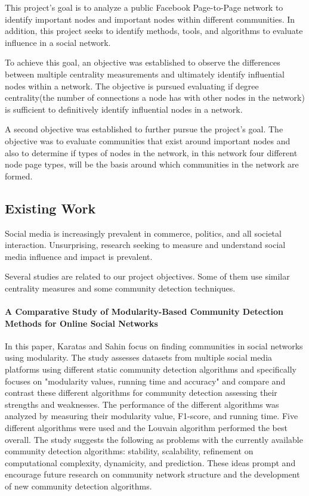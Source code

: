 \documentclass[11pt,twocolumn]{article}
\begin{document}
This project's goal is to analyze a public Facebook Page-to-Page network to identify important nodes and important nodes within different communities. In addition, this project seeks to identify methods, tools, and algorithms to evaluate influence in a social network. 

To achieve this goal, an objective was established to observe the differences between multiple centrality measurements and ultimately identify influential nodes within a network. The objective is pursued evaluating if degree centrality(the number of connections a node has with other nodes in the network) is sufficient to definitively identify influential nodes in a network.


A second objective was established to further pursue the project’s goal. The objective was to evaluate communities that exist around important nodes and also to determine if types of nodes in the network, in this network four different node page types, will be the basis around which communities in the network are formed.


\subsection{Existing Work}

Social media is increasingly prevalent in commerce, politics, and all societal interaction. Unsurprising, research seeking to measure and understand social media influence and impact is prevalent. 

Several studies are related to our project objectives. Some of them use similar centrality measures and some community detection techniques. 

\paragraph{A Comparative Study of Modularity-Based Community Detection Methods for Online Social Networks \cite{modularity-based-community}}   
 
In this paper, Karatas and Sahin focus on finding communities in social networks using modularity. The study assesses datasets from multiple social media platforms using different static community detection algorithms and specifically focuses on "modularity values, running time and accuracy"\cite{modularity-based-community} and compare and contrast these different algorithms for community detection assessing their strengths and weaknesses. The performance of the different algorithms was analyzed by measuring their modularity value, F1-score, and running time. Five different algorithms were used and the Louvain algorithm performed the best overall. The study suggests the following as problems with the currently available community detection algorithms: stability, scalability, refinement on computational complexity, dynamicity, and prediction. These ideas prompt and encourage future research on community network structure and the development of new community detection algorithms.
\end{document}
